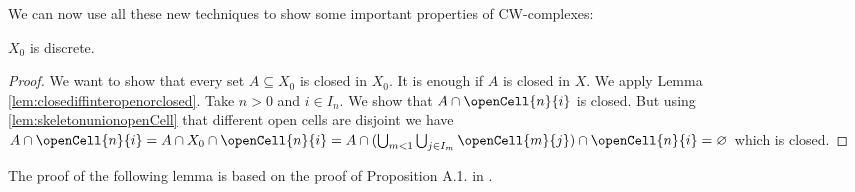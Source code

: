 We can now use all these new techniques to show some important properties of CW-complexes: 

\begin{lem} \label{lem:discretelevel0}
    $X_0$ is discrete.
\end{lem}
\begin{proof}
    We want to show that every set $A \subseteq X_0$ is closed in $X_0$.
    It is enough if $A$ is closed in $X$. 
    We apply Lemma \ref{lem:closediffinteropenorclosed}. 
    Take $n > 0$ and $i \in I_n$. 
    We show that $A \cap \openCell{n}{i}$ is closed. 
    But using \ref{lem:skeletonunionopenCell} that different open cells are disjoint we have $A \cap \openCell{n}{i} = A \cap X_0 \cap \openCell{n}{i} = A \cap (\bigcup_{m < 1}\bigcup_{j \in I_m}\openCell{m}{j}) \cap \openCell{n}{i} = \varnothing$ which is closed.
\end{proof}

The proof of the following lemma is based on the proof of Proposition A.1. in \cite{Hatcher2001}.

